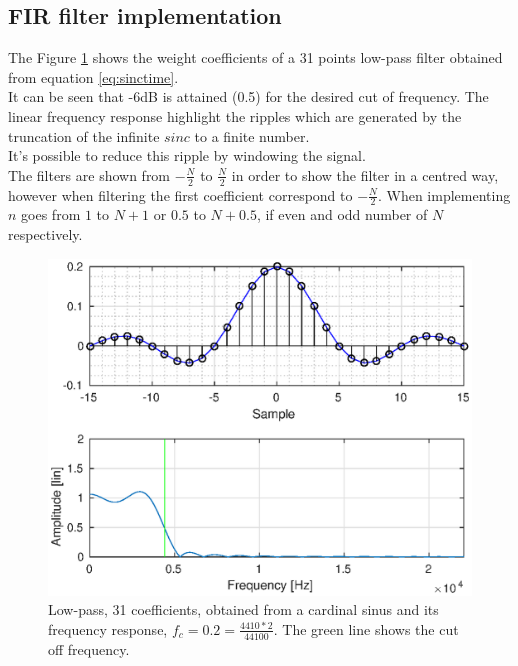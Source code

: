 \documentclass[twoside,twocolumn]{article}
\begin{document}
\subsection{FIR filter implementation}
The Figure \ref{discrete_sinc} shows the weight coefficients of a 31 points low-pass filter obtained from equation \ref{eq:sinctime}.\\ It can be seen  that -6dB is attained (0.5) for the desired cut of frequency. The linear frequency response highlight the ripples which are generated by the truncation of the infinite $sinc$ to a finite number.\\ It's possible to reduce this ripple by windowing the signal.\\ The filters are shown from $-\frac{N}{2}$ to $\frac{N}{2}$ in order to show the filter in a centred way, however when filtering the first coefficient correspond to  $-\frac{N}{2}$. When implementing $n$ goes from $1$ to $N+1$ or $0.5$ to $N+0.5$, if even and odd number of $N$ respectively.
\begin{figure}[h!]
	\centering
	\includegraphics[scale=0.45]{./images/lp_31pts_fc02.eps}
	\caption{Low-pass, 31 coefficients, obtained from a cardinal sinus and its frequency response, $f_c=0.2=\frac{4410*2}{44100}$. The green line shows the cut off frequency.}
	\label{discrete_sinc}
\end{figure}
\end{document}
